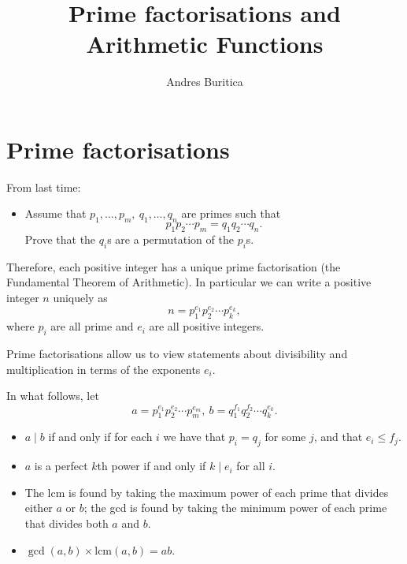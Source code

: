 \documentclass{article}
\title{Prime factorisations and Arithmetic Functions}
\author{Andres Buritica}
\date{}
\newcommand\lcm{\text{lcm}}
\begin{document}
\maketitle
\section{Prime factorisations}
  From last time:
  \begin{itemize}
    \item Assume that $p_1,\ldots,p_m,\ q_1,\ldots,q_n$ are primes such that
      \[p_1p_2\cdots p_m=q_1q_2\cdots q_n.\]
      Prove that the $q_i$s are a permutation of the $p_i$s.
  \end{itemize}
  Therefore, each positive integer has a unique prime factorisation (the
  Fundamental Theorem of Arithmetic).
  In particular we can write a positive integer $n$ uniquely as
  \[n=p_1^{e_1}p_2^{e_2}\cdots p_k^{e_k},\]
  where $p_i$ are all prime and $e_i$ are all positive integers.

  Prime factorisations allow us to view statements about divisibility and
  multiplication in terms of the exponents $e_i$.

  In what follows, let 
  \[a=p_1^{e_1}p_2^{e_2}\cdots p_m^{e_m},\
        b=q_1^{f_1}q_2^{f_2}\cdots q_k^{e_k}.\]
  \begin{itemize}
    \item $a\mid b$ if and only if for each $i$ we have that $p_i=q_j$
      for some $j$, and that $e_i\le f_j$.
    \item $a$ is a perfect $k$th power if and only if $k\mid e_i$ for all $i$.
    \item The lcm is found by taking the maximum power of each prime that
      divides either $a$ or $b$; the gcd is found by taking the minimum power of
      each prime that divides both $a$ and $b$.
    \item $\gcd(a,b)\times\lcm(a,b)=ab$.
  \end{itemize}
  \newpage
\end{document}

